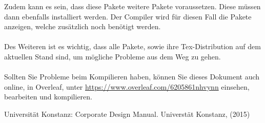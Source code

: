 \documentclass[11pt, rgb]{scrreprt}
\begin{document}
Zudem kann es sein, dass diese Pakete weitere Pakete voraussetzen. Diese müssen dann ebenfalls installiert werden. Der Compiler wird für diesen Fall die Pakete
anzeigen, welche zusätzlich noch benötigt werden.\\
\\
Des Weiteren ist es wichtig, dass alle Pakete, sowie ihre Tex-Distribution auf dem aktuellen Stand sind, um mögliche Probleme aus dem Weg zu gehen.\\
\\
Sollten Sie Probleme beim Kompilieren haben, können Sie dieses Dokument auch online, in Overleaf, unter \url{https://www.overleaf.com/6205861nhvynn} einsehen, bearbeiten und kompilieren. 




%
%
%


\begin{thebibliography}{[MB91a]}

\normalsize
\sffamily

\setlength{\itemsep}{6pt}

Universität Konstanz: Corporate Design Manual.
Universtät Konstanz, (2015)

\end{thebibliography}

\end{document}
